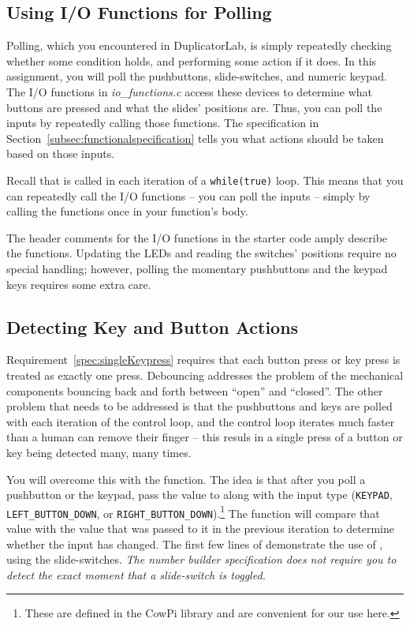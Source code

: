 \subsection{Using I/O Functions for Polling}

Polling, which you encountered in DuplicatorLab, is simply repeatedly checking whether some condition holds, and performing some action if it does.
In this assignment, you will poll the pushbuttons, slide-switches, and numeric keypad.
The I/O functions in \textit{io\_functions.c} access these devices to determine what buttons are pressed and what the slides' positions are.
Thus, you can poll the inputs by repeatedly calling those functions.
The specification in Section~\ref{subsec:functionalspecification} tells you what actions should be taken based on those inputs.

Recall that  is called in each iteration of a \lstinline{while(true)} loop.
This means that you can repeatedly call the I/O functions -- you can poll the inputs -- simply by calling the functions once in your  function's body.

The header comments for the I/O functions in the starter code amply describe the functions.
Updating the LEDs and reading the switches' positions require no special handling;
however, polling the momentary pushbuttons and the keypad keys requires some extra care.


\subsection{Detecting Key and Button Actions}

Requirement~\ref{spec:singleKeypress} requires that each button press or key press is treated as exactly one press.
Debouncing addresses the problem of the mechanical components bouncing back and forth between ``open'' and ``closed''.
The other problem that needs to be addressed is that the pushbuttons and keys are polled with each iteration of the control loop,
and the control loop iterates much faster than a human can remove their finger -- this resuls in a single press of a button or key being detected many, many times.

You will overcome this with the  function.
The idea is that after you poll a pushbutton or the keypad,
pass the value to  along with the input type (\lstinline{KEYPAD}, \lstinline{LEFT_BUTTON_DOWN}, or \lstinline{RIGHT_BUTTON_DOWN}).\footnote{
    These are defined in the CowPi library and are convenient for our use here.
}
The function will compare that value with the value that was passed to it in the previous iteration to determine whether the input has changed.
The first few lines of  demonstrate the use of , using the slide-switches.
\textit{The number builder specification does not require you to detect the exact moment that a slide-switch is toggled.}

